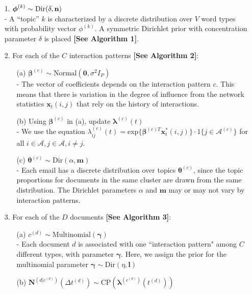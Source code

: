 \documentclass[a4paper]{article}
\begin{document}
\begin{itemize}
	\item[1.] {$\boldsymbol{\phi}^{(k)} \sim \mbox{Dir}(\delta, \bf n)$}\\
	- A “topic” $k$ is characterized by a discrete distribution over $V$ word types with probability vector $\phi^{(k)}$. A symmetric Dirichlet prior with concentration parameter $\delta$ is placed \textbf{[See Algorithm 1]}.
\item[2.] For each of the $C$ interaction patterns \textbf{[See Algorithm 2]}:
\begin{itemize}
	\item[(a)] $\boldsymbol{\beta}^{(c)}\sim \mbox{Normal}(\textbf{0}, \sigma^2I_P)$\\ 
	- The vector of coefficients depends on the interaction pattern $c$. This means that there is variation in the degree of influence from the network statistics $\boldsymbol{x}_t(i, j)$ that rely on the history of interactions.
	\item[(b)] Using $\boldsymbol{\beta}^{(c)}$ in (a), update $\boldsymbol{\lambda}^{(c)}(t)$\\
	- We use the equation $\lambda^{(c)}_{ij}(t)= \mbox{exp}\Big\{\boldsymbol{\beta}^{(c)T}\boldsymbol{x}^*_t(i, j)\Big\}\cdot 1\{j \in \mathcal{A}^{(c)}\}$ for all $i \in \mathcal{A}, j \in \mathcal{A}, i\neq j$.
	\item[(c)] $\boldsymbol{\theta}^{(c)}\sim \mbox{Dir}(\alpha, \textbf{m})$\\
	- Each email has a discrete distribution over topics $\boldsymbol{\theta}^{(c)}$, since the topic proportions for documents in the same cluster are drawn from the same distribution. The Dirichlet parameters $\alpha$ and $\textbf{m}$ may or may not vary by interaction patterns.
\end{itemize}
\item[3.] For each of the $D$ documents \textbf{[See Algorithm 3]}:
\begin{itemize}
	\item[(a)] $c^{(d)}\sim \mbox{Multinomial}(\boldsymbol{\gamma})$\\
	- Each document $d$ is associated with one ``interaction pattern" among $C$ different types, with parameter $\boldsymbol{\gamma}$. Here, we assign the prior for the multinomial parameter $\boldsymbol{\gamma} \sim \mbox{Dir}({\eta}, \boldsymbol{l})$
	\item[(b)] $\mathbf{N}^{(d|c^{(d)})}(\Delta t^{(d)}) \sim \mbox{CP}(\boldsymbol{\lambda}^{(c^{(d)})}(t^{(d)}))$\\

\end{itemize}
\end{itemize}
\end{document}
